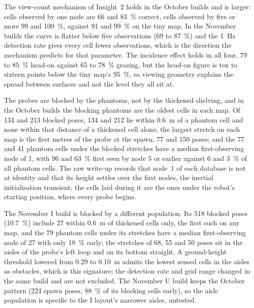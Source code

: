 \documentclass[11pt,a4paper,notitlepage]{report}
\newcommand{\insdir}{../../../../output/compare/simulation/exp4-insights}
\newcommand{\ins}[1]{}
\begin{document}
The view-count mechanism of Insight~2 holds in the October builds and is
larger: cells observed by one node are 66 and \SI{83}{\percent} correct, cells
observed by five or more 99 and \SI{100}{\percent}, against 91 and
\SI{99}{\percent} on the tiny map. In the November builds the curve is flatter
below five observations (69 to \SI{87}{\percent}) and the \SI{1}{\hertz}
detection rate gives every cell fewer observations, which is the direction the
mechanism predicts for that parameter. The incidence effect holds in all four,
79 to \SI{85}{\percent} head-on against 65 to \SI{78}{\percent} grazing, but
the head-on figure is ten to sixteen points below the tiny map's
\SI{95}{\percent}, so viewing geometry explains the spread between surfaces
and not the level they all sit at.

\ins{drivability_realistic.tex}
\ins{blocked_realistic.tex}

The probes are blocked by the phantoms, not by the thickened shelving, and in
the October builds the blocking phantoms are the oldest cells in each map. Of
134 and 213 blocked poses, 134 and 212 lie within \SI{0.6}{\metre} of a
phantom cell and none within that distance of a thickened cell alone; the
largest stretch on each map is the first metres of the probe at the spawn, 77
and 150 poses; and the 77 and 41 phantom cells under the blocked stretches have
a median first-observing node of 1, with 96 and \SI{63}{\percent} first seen by
node 5 or earlier against 6 and \SI{3}{\percent} of all phantom cells. The raw
write-up records that node~1 of each database is not at identity and that its
height settles over the first nodes, the inertial initialisation transient; the
cells laid during it are the ones under the robot's starting position, where
every probe begins.

The November I build is blocked by a different population. Its 518 blocked
poses (\SI{10.7}{\percent}) include 27 within \SI{0.6}{\metre} of thickened
cells only, the first such on any map, and the 79 phantom cells under its
stretches have a median first-observing node of 27 with only \SI{18}{\percent}
early; the stretches of 68, 55 and 50 poses sit in the aisles of the probe's
left loop and on its bottom straight. A ground-height threshold lowered from
0.29 to \SI{0.10}{\metre} admits the lowest sensed cells in the aisles as
obstacles, which is this signature; the detection rate and grid range changed
in the same build and are not excluded. The November U build keeps the
October pattern (224 spawn poses, \SI{88}{\percent} of its blocking cells
early), so the aisle population is specific to the I layout's narrower aisles,
untested.
\end{document}
